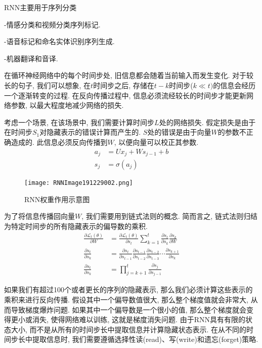 RNN主要用于序列分类

-情感分类和视频分类序列标记.

-语音标记和命名实体识别序列生成.

-机器翻译和音译.

在循环神经网络中的每个时间步处, 旧信息都会随着当前输入而发生变化. 对于较长的句子, 我们可以想象, 在$t$时间步之后, 存储在$t-k$时间步($k\ll t)$的信息会经历一个逐渐转变的过程.
在反向传播过程中, 信息必须流经较长的时间步才能更新网络参数, 以最大程度地减少网络的损失.

考虑一个场景, 在该场景中, 我们需要计算时间步$L$处的网络损失. 假定损失是由于在时间步$S_1$对隐藏表示的错误计算而产生的. $S$处的错误是由于向量$W$的参数不正确造成的. 此信息必须反向传播到$W$, 以便向量可以校正其参数.
\begin{align}
    a_{j}&=U x_{j}+W s_{j-1}+b\\
    s_{j}&=\sigma\left(a_{j}\right)
\end{align}
\begin{figure}[H]
\centering
\texttt{[image: RNNImage191229002.png]}
\caption{RNN权重作用示意图}
\label{RNNImage191229002}\vspace{-0.4cm}
\end{figure}

为了将信息传播回向量$W$, 我们需要用到链式法则的概念. 简而言之, 链式法则归结为特定时间步的所有隐藏表示的偏导数的乘积.
\begin{align}
\frac{\partial \mathscr{L}_{t}(\theta)}{\partial W}&=\frac{\partial \mathscr{L}_{t}(\theta)}{\partial s_{t}} \sum_{k=1}^{t} \frac{\partial s_{t}}{\partial s_{k}} \frac{\partial s_{k}}{\partial W}\\
\frac{\partial s_{t}}{\partial s_{k}}&=\frac{\partial s_{t}}{\partial s_{t-1}} \frac{\partial s_{t-1}}{\partial s_{t-2}} \frac{\partial s_{t-2}}{\partial s_{t-3}} \cdots \frac{\partial s_{k+1}}{\partial s_{k}}\\
\frac{\partial s_{t}}{\partial s_{k}}&=\prod_{j=k+1}^{t} \frac{\partial s_{j}}{\partial s_{j-1}}
\end{align}

如果我们有超过100个或者更长的序列的隐藏表示, 那么我们必须计算这些表示的乘积来进行反向传播. 假设其中一个偏导数值很大, 那么整个梯度值就会非常大, 从而导致梯度爆炸问题.
如果其中一个偏导数是一个很小的值, 那么整个梯度就会变得更小或消失, 使得网络难以训练, 这就是梯度消失问题.
由于RNN具有有限的状态大小, 而不是从所有的时间步长中提取信息并计算隐藏状态表示. 在从不同的时间步长中提取信息时, 我们需要遵循选择性读(read)、写(write)和遗忘(forget)策略.

